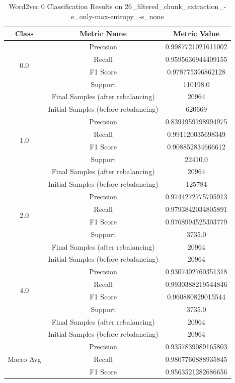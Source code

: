 \begin{longtable}{|c|c|c|}
\caption{Word2vec 0 Classification Results on 26\_filtered\_chunk\_extraction\_-e\_only-max-entropy\_-s\_none} \label{tab:26_filtered_chunk_extraction_-e_only-max-entropy_-s_none_word2vec_0_classifiers_results} \\
\hline
Class & Metric Name & Metric Value \\
\hline
\multirow{4}{*}{0.0} & Precision & 0.9987721021611002 \\
 & Recall & 0.9595636944409155 \\
 & F1 Score & 0.978775396862128 \\
 & Support & 110198.0 \\
 & Final Samples (after rebalancing) & 20964 \\
 & Initial Samples (before rebalancing) & 620669 \\
\hline
\multirow{4}{*}{1.0} & Precision & 0.8391959798994975 \\
 & Recall & 0.991120035698349 \\
 & F1 Score & 0.908852834666612 \\
 & Support & 22410.0 \\
 & Final Samples (after rebalancing) & 20964 \\
 & Initial Samples (before rebalancing) & 125784 \\
\hline
\multirow{4}{*}{2.0} & Precision & 0.9744272775705913 \\
 & Recall & 0.9793842034805891 \\
 & F1 Score & 0.9768994525303779 \\
 & Support & 3735.0 \\
 & Final Samples (after rebalancing) & 20964 \\
 & Initial Samples (before rebalancing) & 20964 \\
\hline
\multirow{4}{*}{4.0} & Precision & 0.9307402760351318 \\
 & Recall & 0.9930388219544846 \\
 & F1 Score & 0.960880829015544 \\
 & Support & 3735.0 \\
 & Final Samples (after rebalancing) & 20964 \\
 & Initial Samples (before rebalancing) & 20964 \\
\hline
\multirow{4}{*}{Macro Avg} & Precision & 0.9357839089165803 \\
 & Recall & 0.9807766888935845 \\
 & F1 Score & 0.9563521282686656 \\

\end{longtable}
